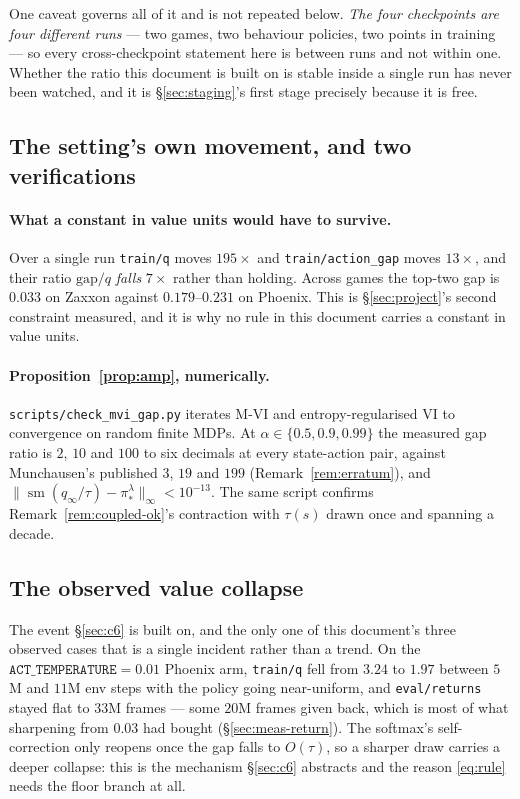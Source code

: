 \documentclass{article}
\DeclareMathOperator{\sm}{sm}
\begin{document}
One caveat governs all of it and is not repeated below. \emph{The four checkpoints are four
different runs} --- two games, two behaviour policies, two points in training --- so every
cross-checkpoint statement here is between runs and not within one. Whether the ratio this
document is built on is stable inside a single run has never been watched, and it is
\S\ref{sec:staging}'s first stage precisely because it is free.


\subsection{The setting's own movement, and two verifications}
\label{sec:meas-mvi}

\paragraph{What a constant in value units would have to survive.} Over a single run
\texttt{train/q} moves $195\times$ and \texttt{train/action\_gap} moves $13\times$, and their
ratio $\mathrm{gap}/q$ \emph{falls} $7\times$ rather than holding. Across games the top-two gap is
$0.033$ on Zaxxon against $0.179$--$0.231$ on Phoenix. This is \S\ref{sec:project}'s second
constraint measured, and it is why no rule in this document carries a constant in value units.

\paragraph{Proposition~\ref{prop:amp}, numerically.} \texttt{scripts/check\_mvi\_gap.py} iterates
M-VI and entropy-regularised VI to convergence on random finite MDPs. At
$\alpha \in \{0.5, 0.9, 0.99\}$ the measured gap ratio is $2$, $10$ and $100$ to six decimals at
every state-action pair, against Munchausen's published $3$, $19$ and $199$
(Remark~\ref{rem:erratum}), and $\|\sm(q_\infty/\tau) - \pi_*^\lambda\|_\infty < 10^{-13}$. The
same script confirms Remark~\ref{rem:coupled-ok}'s contraction with $\tau(s)$ drawn once and
spanning a decade.

\subsection{The observed value collapse}
\label{sec:meas-collapse}

The event \S\ref{sec:c6} is built on, and the only one of this document's three observed cases
that is a single incident rather than a trend. On the $\texttt{ACT\_TEMPERATURE} = 0.01$ Phoenix
arm, \texttt{train/q} fell from $3.24$ to $1.97$ between $5$M and $11$M env steps with the policy
going near-uniform, and \texttt{eval/returns} stayed flat to $33$M frames --- some $20$M frames
given back, which is most of what sharpening from $0.03$ had bought (\S\ref{sec:meas-return}).
The softmax's self-correction only reopens once the gap falls to $O(\tau)$, so a sharper draw
carries a deeper collapse: this is the mechanism \S\ref{sec:c6} abstracts and the reason
\eqref{eq:rule} needs the floor branch at all.
\end{document}
